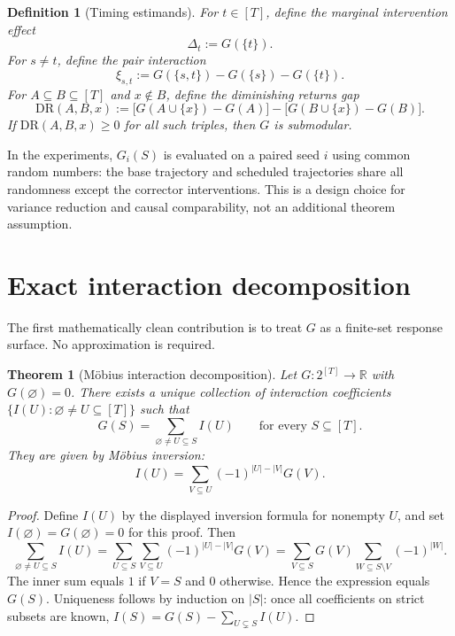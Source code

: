 \documentclass[11pt]{article}
\newtheorem{definition}{Definition}
\newtheorem{theorem}{Theorem}
\newcommand{\R}{\mathbb R}
\newcommand{\1}{\mathbf 1}
\begin{document}
\begin{definition}[Timing estimands]
For \(t\in[T]\), define the marginal intervention effect
\[
  \Delta_t := G(\{t\}).
\]
For \(s\ne t\), define the pair interaction
\[
  \xi_{s,t}
  :=
  G(\{s,t\}) - G(\{s\}) - G(\{t\}).
\]
For \(A\subseteq B\subseteq [T]\) and \(x\notin B\), define the diminishing
returns gap
\[
  \mathrm{DR}(A,B,x)
  :=
  \bigl[G(A\cup\{x\})-G(A)\bigr]
  -
  \bigl[G(B\cup\{x\})-G(B)\bigr].
\]
If \(\mathrm{DR}(A,B,x)\ge 0\) for all such triples, then \(G\) is submodular.
\end{definition}

In the experiments, \(G_i(S)\) is evaluated on a paired seed \(i\) using common
random numbers: the base trajectory and scheduled trajectories share all
randomness except the corrector interventions.  This is a design choice for
variance reduction and causal comparability, not an additional theorem
assumption.

\section{Exact interaction decomposition}

The first mathematically clean contribution is to treat \(G\) as a finite-set
response surface.  No approximation is required.

\begin{theorem}[Möbius interaction decomposition]
Let \(G:2^{[T]}\to\R\) with \(G(\varnothing)=0\).  There exists a unique
collection of interaction coefficients \(\{I(U):\varnothing\ne U\subseteq[T]\}\)
such that
\[
  G(S)=\sum_{\varnothing\ne U\subseteq S} I(U)
  \qquad \text{for every } S\subseteq[T].
\]
They are given by Möbius inversion:
\[
  I(U)=\sum_{V\subseteq U} (-1)^{|U|-|V|}G(V).
\]
\end{theorem}

\begin{proof}
Define \(I(U)\) by the displayed inversion formula for nonempty \(U\), and set
\(I(\varnothing)=G(\varnothing)=0\) for this proof.  Then
\[
  \sum_{\varnothing\ne U\subseteq S} I(U)
  =
  \sum_{U\subseteq S}\sum_{V\subseteq U}(-1)^{|U|-|V|}G(V)
  =
  \sum_{V\subseteq S} G(V)
  \sum_{W\subseteq S\setminus V}(-1)^{|W|}.
\]
The inner sum equals \(1\) if \(V=S\) and \(0\) otherwise.  Hence the expression
equals \(G(S)\).  Uniqueness follows by induction on \(|S|\): once all
coefficients on strict subsets are known, \(I(S)=G(S)-\sum_{U\subsetneq S}I(U)\).
\end{proof}
\end{document}
